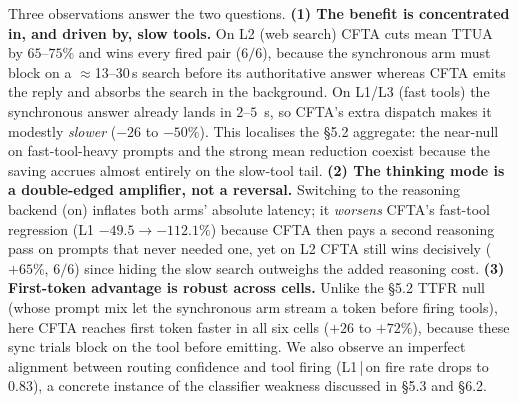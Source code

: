 \documentclass[numbered,mediumone,traditional]{oup-authoring-template}
\begin{document}
\begin{table}[htbp]
\caption{Sensitivity matrix (DeepSeek flash\,=\,off / pro\,=\,on). $\Delta$TTUA\,\%\ $=$ (sync${-}$CFTA)/sync\,$\times$100, positive $=$ CFTA faster; ``Win'' $=$ pairs where CFTA is faster / attempted fired pairs; $\Delta$TTFR\,\% is the analogous first-token reduction. CFTA-fired TTUA only.}
\label{tab:sensitivity}
\centering
\footnotesize
{}
\end{table}

Three observations answer the two questions. \textbf{(1) The benefit is concentrated in, and driven by, slow tools.} On L2 (web search) CFTA cuts mean TTUA by $65$--$75\%$ and wins every fired pair ($6/6$), because the synchronous arm must block on a $\approx$13--30\,s search before its authoritative answer whereas CFTA emits the reply and absorbs the search in the background. On L1/L3 (fast tools) the synchronous answer already lands in $2$--$5$~s, so CFTA's extra dispatch makes it modestly \emph{slower} ($-26$ to $-50\%$). This localises the \S5.2 aggregate: the near-null on fast-tool-heavy prompts and the strong mean reduction coexist because the saving accrues almost entirely on the slow-tool tail. \textbf{(2) The thinking mode is a double-edged amplifier, not a reversal.} Switching to the reasoning backend (on) inflates both arms' absolute latency; it \emph{worsens} CFTA's fast-tool regression (L1 $-49.5\to-112.1\%$) because CFTA then pays a second reasoning pass on prompts that never needed one, yet on L2 CFTA still wins decisively ($+65\%$, $6/6$) since hiding the slow search outweighs the added reasoning cost. \textbf{(3) First-token advantage is robust across cells.} Unlike the \S5.2 TTFR null (whose prompt mix let the synchronous arm stream a token before firing tools), here CFTA reaches first token faster in all six cells ($+26$ to $+72\%$), because these sync trials block on the tool before emitting. We also observe an imperfect alignment between routing confidence and tool firing (L1\,|\,on fire rate drops to $0.83$), a concrete instance of the classifier weakness discussed in \S5.3 and \S6.2.
\end{document}
